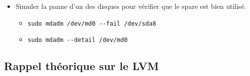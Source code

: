 \documentclass[a4paper]{article}
\begin{document}
\begin{itemize}
\item Simuler la panne d'un des disques pour vérifier que le spare est bien utilisé.
\begin{example}
    \begin{itemize}
        \item \texttt{sudo mdadm /dev/md0 -{}-fail /dev/sda8}
        \item \texttt{sudo mdadm -{}-detail /dev/md0}
    \end{itemize}
\end{example}

\end{itemize}










\subsection{Rappel théorique sur le LVM}
\end{document}
